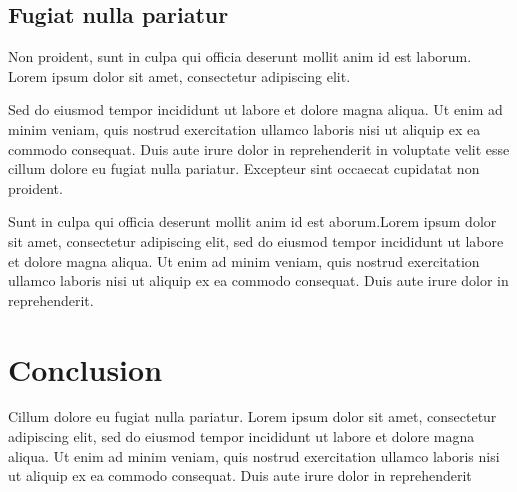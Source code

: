 \documentclass[11pt]{memoir}
\begin{document}
\subsection {Fugiat nulla pariatur} Non proident, sunt in culpa qui officia deserunt mollit anim id est laborum. Lorem ipsum dolor sit amet, consectetur adipiscing elit.

Sed do eiusmod tempor incididunt ut labore et dolore magna aliqua. Ut enim ad minim veniam, quis nostrud exercitation ullamco laboris nisi ut aliquip ex ea commodo consequat. Duis aute irure dolor in reprehenderit in voluptate velit esse cillum dolore eu fugiat nulla pariatur. Excepteur sint occaecat cupidatat non proident.


Sunt in culpa qui officia deserunt mollit anim id est aborum.Lorem ipsum dolor sit amet, consectetur adipiscing elit, sed do eiusmod tempor incididunt ut labore et dolore magna aliqua. Ut enim ad minim veniam, quis nostrud exercitation ullamco laboris nisi ut aliquip ex ea commodo consequat. Duis aute irure dolor in reprehenderit.

\section{Conclusion } Cillum dolore eu fugiat nulla pariatur. Lorem ipsum dolor sit amet, consectetur adipiscing elit, sed do eiusmod tempor incididunt ut labore et dolore magna aliqua. Ut enim ad minim veniam, quis nostrud exercitation ullamco laboris nisi ut aliquip ex ea commodo consequat. Duis aute irure dolor in reprehenderit


\renewcommand{\bibname}{Références bibliographiques} 


\nocite{*}



\end{document}
